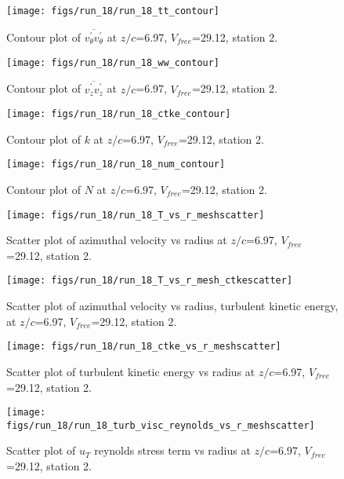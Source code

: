 \begin{figure}[H]
\centering
\texttt{[image: figs/run\_18/run\_18\_tt\_contour]}
\caption{Contour plot of $\overline{v_{\theta}^{\prime} v_{\theta}^{\prime}}$ at $z/c$=6.97, $V_{free}$=29.12, station 2.}
\end{figure}


\begin{figure}[H]
\centering
\texttt{[image: figs/run\_18/run\_18\_ww\_contour]}
\caption{Contour plot of $\overline{v_{z}^{\prime} v_{z}^{\prime}}$ at $z/c$=6.97, $V_{free}$=29.12, station 2.}
\end{figure}


\begin{figure}[H]
\centering
\texttt{[image: figs/run\_18/run\_18\_ctke\_contour]}
\caption{Contour plot of $k$ at $z/c$=6.97, $V_{free}$=29.12, station 2.}
\end{figure}


\begin{figure}[H]
\centering
\texttt{[image: figs/run\_18/run\_18\_num\_contour]}
\caption{Contour plot of $N$ at $z/c$=6.97, $V_{free}$=29.12, station 2.}
\end{figure}


\begin{figure}[H]
\centering
\texttt{[image: figs/run\_18/run\_18\_T\_vs\_r\_meshscatter]}
\caption{Scatter plot of azimuthal velocity vs radius at $z/c$=6.97, $V_{free}$=29.12, station 2.}
\end{figure}


\begin{figure}[H]
\centering
\texttt{[image: figs/run\_18/run\_18\_T\_vs\_r\_mesh\_ctkescatter]}
\caption{Scatter plot of azimuthal velocity vs radius, turbulent kinetic energy, at $z/c$=6.97, $V_{free}$=29.12, station 2.}
\end{figure}


\begin{figure}[H]
\centering
\texttt{[image: figs/run\_18/run\_18\_ctke\_vs\_r\_meshscatter]}
\caption{Scatter plot of turbulent kinetic energy vs radius at $z/c$=6.97, $V_{free}$=29.12, station 2.}
\end{figure}


\begin{figure}[H]
\centering
\texttt{[image: figs/run\_18/run\_18\_turb\_visc\_reynolds\_vs\_r\_meshscatter]}
\caption{Scatter plot of $
u_T$ reynolds stress term vs radius at $z/c$=6.97, $V_{free}$=29.12, station 2.}
\end{figure}


